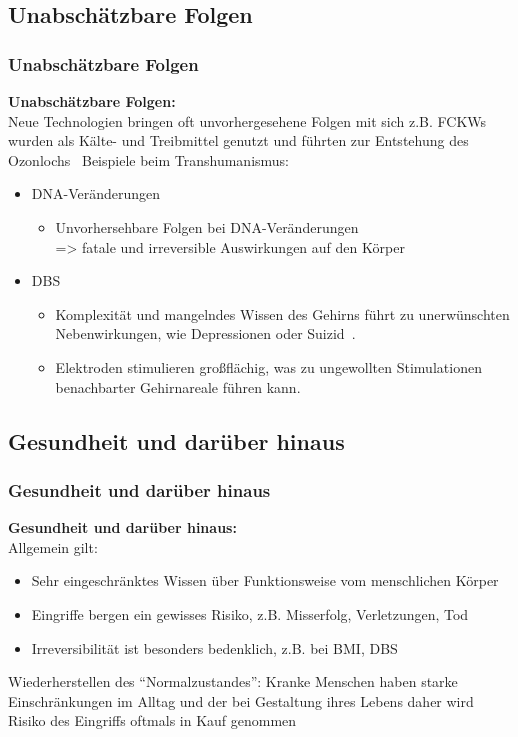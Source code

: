 \documentclass[aspectratio=169,16pt,xcolor=table]{beamer}
\begin{document}
\subsection{Unabschätzbare Folgen}
\begin{frame}
  \frametitle{Unabschätzbare Folgen}
  \textbf{Unabschätzbare Folgen:}\\
  \small Neue Technologien bringen oft unvorhergesehene Folgen mit sich z.B. FCKWs wurden als Kälte- und Treibmittel genutzt und führten zur Entstehung des Ozonlochs~\cite{rowland1996stratospheric}
  Beispiele beim Transhumanismus:
  \begin{itemize}
    \item DNA-Veränderungen
    \begin{itemize}
      \item Unvorhersehbare Folgen bei DNA-Veränderungen\\
      => fatale und irreversible Auswirkungen auf den Körper
    \end{itemize}
    \item DBS
    \begin{itemize}
      \item Komplexität und mangelndes Wissen des Gehirns führt zu unerwünschten Nebenwirkungen, wie Depressionen oder Suizid~\cite{zarzycki2020stimulation}.
      \item Elektroden stimulieren großflächig, was zu ungewollten Stimulationen benachbarter Gehirnareale führen kann.
    \end{itemize}
  \end{itemize}
\end{frame}

\subsection{Gesundheit und darüber hinaus}
\begin{frame}
  \frametitle{Gesundheit und darüber hinaus}
  \textbf{Gesundheit und darüber hinaus:}\\
  Allgemein gilt:
  \begin{itemize}
      \item Sehr eingeschränktes Wissen über Funktionsweise vom menschlichen Körper
      \item Eingriffe bergen ein gewisses Risiko, z.B. Misserfolg, Verletzungen, Tod
      \item Irreversibilität ist besonders bedenklich, z.B. bei BMI, DBS
  \end{itemize}
  Wiederherstellen des ``Normalzustandes'':
  Kranke Menschen haben starke Einschränkungen im Alltag und der bei Gestaltung ihres Lebens daher wird Risiko des Eingriffs oftmals in Kauf genommen
\end{frame}
\end{document}
